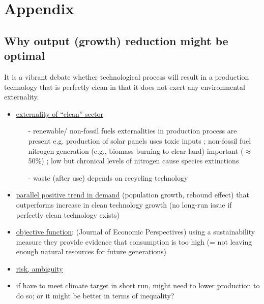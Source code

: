 \clearpage
\appendix
\section{Appendix}
\subsection{Why output (growth) reduction might be optimal}
It is a vibrant debate whether technological process will result in a production technology that is perfectly clean in that it does not exert any environmental externality. 
\begin{itemize}
	\item \underline{externality of ``clean'' sector} \citep[see also][]{Dasgupta2021, Brock2005ChapterEmpirics}
	\begin{itemize}
		\item[-] renewable/ non-fossil fuels \ar externalities in production process are present e.g. production of solar panels uses toxic inputs \citep{Yue2014DomesticAnalysis}; non-fossil fuel nitrogen generation (e.g., biomass burning to clear land) important ($\approx$ 50\%) \citep{Song2021ImportantEmissions}; low but chronical levels of nitrogen cause species extinctions \citep{Clark2008LossGrasslands}
		\item[-] waste (after use) \ar depends on recycling technology %
		
	\end{itemize}
	\item \underline{parallel positive trend in demand} (population growth, rebound effect) that outperforms increase in clean technology growth \small{(no long-run issue if perfectly clean technology exists)}
	\item \normalsize{\underline{objective function}:} \cite{Arrow2004AreMuch}(Journal of Economic Perspectives) \ar using a sustainability measure they provide evidence that consumption is too high (= not leaving enough natural resources for future generations)
	\item \underline{risk, ambiguity}
	\item if have to meet climate target in short run, might need to lower production to do so; or it might be better in terms of inequality?
\end{itemize}

